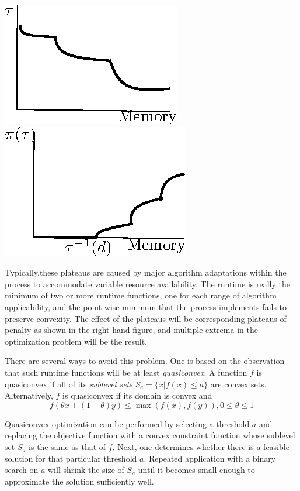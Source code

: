 \includegraphics*{Plateau1.eps}
\includegraphics*{Plateau2.eps}

Typically,these plateaus are caused by major algorithm adaptations within the process to accommodate variable resource availability.  The runtime is really the minimum of two or more runtime functions, one for each range of algorithm applicability, and the point-wise minimum that the process implements fails to preserve convexity.  The effect of the plateaus will be corresponding plateaus of penalty as shown in the right-hand figure, and multiple extrema in the optimization problem will be the result.

There are several ways to avoid this problem.  One is based on the observation that such runtime functions
will be at least \emph{quasiconvex}.  A function $f$ is quasiconvex if all of its \emph{sublevel sets}
$S_a = \{x | f(x) \leq a\}$ are convex sets.
Alternatively, $f$ is quasiconvex if its domain is convex and
\begin{displaymath}
f(\theta x + (1-\theta)y) \leq \max(f(x),f(y)), 0 \leq \theta \leq 1
\end{displaymath}

Quasiconvex optimization can be performed by selecting a threshold $a$ and replacing the objective function
with a convex constraint function whose sublevel set $S_a$ is the same as that of $f$.
Next, one determines whether there is a feasible solution for that particular threshold $a$.
Repeated application with a binary search on $a$ will shrink the size of $S_a$
until it becomes small enough to approximate the solution sufficiently well.


